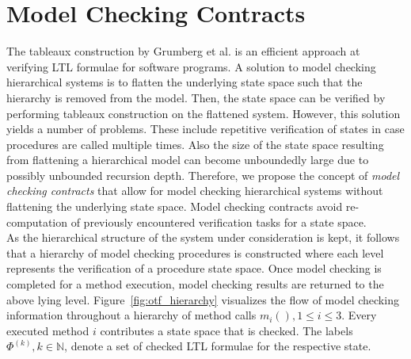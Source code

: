 \documentclass[a4paper, 12pt, twoside]{report}
\begin{document}
	\section{Model Checking Contracts}
	
	The tableaux construction by Grumberg et al. \cite{bhat1995efficient} is an efficient approach at verifying LTL formulae for software programs. A solution to model checking hierarchical systems is to flatten the underlying state space such that the hierarchy is removed from the model. Then, the state space can be verified by performing tableaux construction on the flattened system. However, this solution yields a number of problems. These include repetitive verification of states in case procedures are called multiple times. Also the size of the state space resulting from flattening a hierarchical model can become unboundedly large due to possibly unbounded recursion depth. Therefore, we propose the concept of \textit{model checking contracts}  that allow for model checking hierarchical systems without flattening the underlying state space. Model checking contracts avoid re-computation of previously encountered verification tasks for a state space.\\
		
	As the hierarchical structure of the system under consideration is kept, it follows that a hierarchy of model checking procedures is constructed where each level represents the verification of a procedure state space. Once model checking is completed for a method execution, model checking results are returned to the above lying level. Figure~\ref{fig:otf_hierarchy} visualizes the flow of model checking information throughout a hierarchy of method calls $m_i(), 1 \leq i \leq 3$. Every executed method $i$ contributes a state space that is checked. The labels $\Phi^{(k)}, k \in \mathds{N}$, denote a set of checked LTL formulae for the respective state.\\	
	
\end{document}
